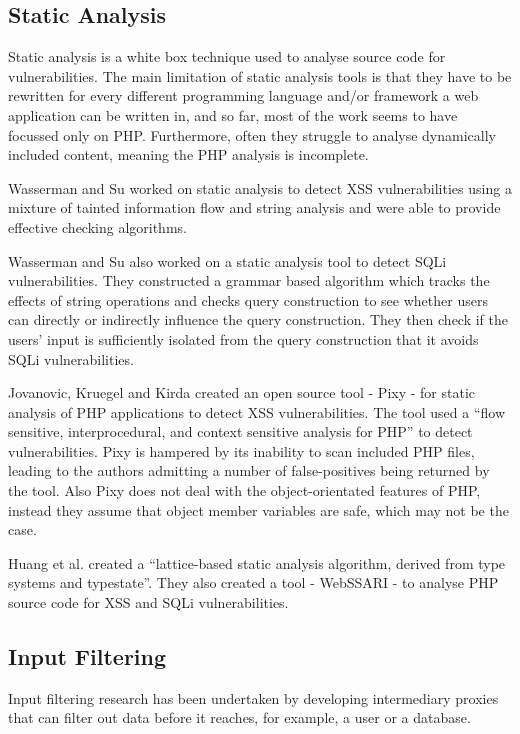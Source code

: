 \documentclass[12pt,a4paper]{article}
\begin{document}
\subsection{Static Analysis}
Static analysis is a white box technique used to analyse source code for vulnerabilities.  The main limitation of static analysis tools is that they have to be rewritten for every different programming language and/or framework a web application can be written in, and so far, most of the work seems to have focussed only on PHP.  Furthermore, often they struggle to analyse dynamically included content, meaning the PHP analysis is incomplete.

Wasserman and Su worked on static analysis to detect XSS vulnerabilities using a mixture of tainted information flow and  string analysis and were able to provide effective checking algorithms. \cite{Wassermann2008}

Wasserman and Su also worked on a static analysis tool to detect SQLi vulnerabilities.  They constructed a grammar based algorithm which tracks the effects of string operations and checks query construction to see whether users can directly or indirectly influence the query construction.   They then check if the users’ input is sufficiently  isolated from the query construction that it avoids SQLi vulnerabilities. \cite{Wassermann2007}

Jovanovic, Kruegel and  Kirda created an open source tool - Pixy - for static analysis of PHP applications to detect XSS vulnerabilities.  The tool used a “flow sensitive, interprocedural, and context sensitive analysis for PHP” to detect vulnerabilities. \cite{Jovanovic2006}  Pixy is hampered by its inability to scan included PHP files, leading to the authors admitting a number of false-positives being returned by the tool.  Also Pixy does not deal with the object-orientated features of PHP, instead they assume that object member variables are safe, which may not be the case.

Huang et al. created a “lattice-based static analysis algorithm, derived from type systems and typestate”.  They also created a tool - WebSSARI - to analyse PHP source code for XSS and SQLi vulnerabilities. \cite{Huang2004}

\subsection{Input Filtering}
Input filtering research has been undertaken by developing intermediary proxies that can filter out data before it reaches, for example, a user or a database.
\end{document}
